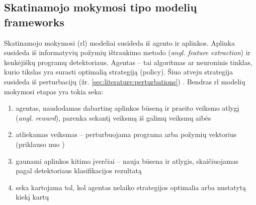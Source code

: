 \subsection{Skatinamojo mokymosi tipo modelių \glspl{framework}}\label{sec:literature:rl}

Skatinamojo mokymosi (\acs{rl}) modeliai susideda iš agento ir aplinkos. Aplinka susideda iš informatyvių požymių ištraukimo metodo (\textit{angl. feature extraction}) ir kenkėjiškų programų detektoriaus. Agentas -- tai algoritmas ar neuroninis tinklas, kurio tikslas yra surasti optimalią strategiją (\gls{policy}). Šiuo atveju strategija susideda iš perturbacijų (žr. \ref{sec:literature:perturbations}) \citeplace. Bendras \ac{rl} modelių mokymosi etapas yra tokia seka:
\begin{enumerate}
    \item agentas, naudodamas dabartinę aplinkos būseną ir praeito veiksmo atlygį (\textit{angl. reward}), parenka sekantį veiksmą iš galimų veiksmų aibės
    \item atliekamas veiksmas -- perturbuojama programa arba požymių vektorius (priklauso nuo )
    \item gaunami aplinkos kitimo įverčiai -- nauja būsena ir atlygis, skaičiuojamas pagal detektoriaus klasifikacijos rezultatą
    \item seka kartojama tol, kol agentas nelaiko strategijos optimalia arba nustatytą kiekį kartų
\end{enumerate}
\citeplace{}